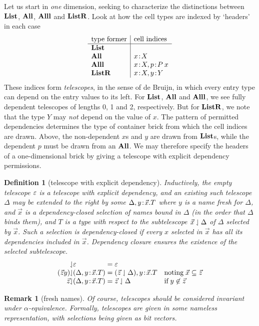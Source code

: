 \documentclass{article}
\newtheorem{defn}[thm]{Definition}
\newtheorem{rem}{Remark}[thm]
\begin{document}
Let us start in \emph{one} dimension, seeking to characterize the distinctions between $\mathbf{List}$, $\mathbf{All}$, $\mathbf{Alll}$ and $\mathbf{ListR}$. Look at how the cell types are indexed by `headers' in each case
\[\begin{array}{l|l}
\mbox{type former} & \mbox{cell indices} \\
\hline
\Li & \\
\All & x\hb X \\
\Alll & x\hb X, p\hb P\:x \\
\ListR & x\hb X, y\hb Y
\end{array}\]
These indices form \emph{telescopes}, in the sense of de Bruijn, in which every entry type can depend on the entry values to its left. For $\mathbf{List}$, $\mathbf{All}$ and $\mathbf{Alll}$, we see fully dependent telescopes of lengths 0, 1 and 2, respectively. But for $\mathbf{ListR}$, we note that the type $Y$ may \emph{not} depend on the value of $x$. The pattern of permitted dependencies determines the type of container brick from which the cell indices are drawn. Above, the non-dependent $x$s and $y$ are drawn from $\mathbf{List}$s, while the dependent $p$ must be drawn from an $\mathbf{All}$. We may therefore specify the headers of a one-dimensional brick by giving a telescope with explicit dependency permissions.

\begin{defn}[telescope with explicit dependency]
  Inductively, the empty telescope $\varepsilon$ is a telescope with explicit dependency, and an existing such telescope $\Delta$ may be extended to the right by some $\Delta,y\!:\!\vec x.T$ where $y$ is a name fresh for $\Delta$, and $\vec x$ is a dependency-closed selection of names bound in $\Delta$ (in the order that $\Delta$ binds them), and $T$ is a type with respect to the subtelescope $\vec x\downharpoonleft\Delta$ of $\Delta$ selected by $\vec x$. Such a selection is dependency-closed if every $x$ selected in $\vec x$ has all its dependencies included in $\vec x$. Dependency closure ensures the existence of the selected subtelescope.
  \[
  \begin{array}{r@{\sel}l@{\;=\;}ll}
    \;&\emp & \emp \\
    (\vec z y)&(\Delta,y\hb\vec x.T) & (\vec z\sel\Delta),y\hb\vec x.T
    &\mbox{noting}\;\vec x \subseteq \vec z\\
    \vec z&(\Delta,y\hb\vec x.T) & \vec z\sel\Delta &\mbox{if}\;y\not\in \vec z \\
    \end{array}
  \]
\end{defn}

\begin{rem}[fresh names]
  Of course, telescopes should be considered invariant under $\alpha$-equivalence. Formally, telescopes are given in some nameless representation, with selections being given as bit vectors.
\end{rem}
\end{document}
